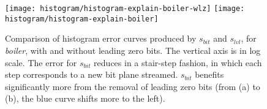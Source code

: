 \begin{figure}[h]
	\centering
	{\texttt{[image: histogram/histogram-explain-boiler-wlz]}}
	{\texttt{[image: histogram/histogram-explain-boiler]}}
	\caption{Comparison of histogram error curves produced by $s_{bit}$ and $s_{lvl}$, for
	\emph{boiler}, with and without leading zero bits. The vertical axis is in log scale. The error
	for $s_{bit}$ reduces in a stair-step fashion, in which each step corresponds to a new bit plane
	streamed. $s_{bit}$ benefits significantly more from the removal of leading zero bits (from (a) to
	(b), the blue curve shifts more to the left).}
	\label{fig:histogram-explain}
\end{figure}
